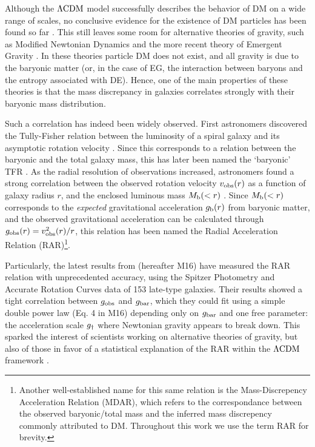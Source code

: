 \documentclass[fleqn,usenatbib]{mnras}
\newcommand{\lcdm}{{\rm \Lambda CDM}}
\newcommand{\un}[1]{_{\rm #1}}
\begin{document}
Although the $\lcdm$ model successfully describes the behavior of DM on a wide range of scales, no conclusive evidence for the existence of DM particles has been found so far \cite[despite years of enormous effort; for an overview, see][]{bertone2005,bertone2018}. This still leaves some room for alternative theories of gravity, such as Modified Newtonian Dynamics  \cite[MOND,][]{milgrom1983} and the more recent theory of Emergent Gravity \cite[EG,][]{verlinde2016}. In these theories particle DM does not exist, and all gravity is due to the baryonic matter (or, in the case of EG, the interaction between baryons and the entropy associated with DE). Hence, one of the main properties of these theories is that the mass discrepancy in galaxies correlates strongly with their baryonic mass distribution.

Such a correlation has indeed been widely observed. First astronomers discovered the Tully-Fisher relation \cite[TFR,][]{tully1977} between the luminosity of a spiral galaxy and its asymptotic rotation velocity \cite[]{pierce1988,bernstein1994}. Since this corresponds to a relation between the baryonic and the total galaxy mass, this has later been named the `baryonic' TFR \cite[BTFR,][]{mcgaugh2000,mcgaugh2012}. As the radial resolution of observations increased, astronomers found a strong correlation between the observed rotation velocity $v\un{obs}(r)$ as a function of galaxy radius $r$, and the enclosed luminous mass \mbox{$M\un{b}(<r)$} \cite[]{sanders1986,sanders1996,mcgaugh2004,sanders2007,wu2015}. Since $M\un{b}(<r)$ corresponds to the \emph{expected} gravitational acceleration $g\un{b}(r)$ from baryonic matter, and the observed gravitational acceleration can be calculated through $g\un{obs}(r)=v\un{obs}^2(r)/r$, this relation has been named the Radial Acceleration Relation (RAR)\footnote{Another well-established name for this same relation is the Mass-Discrepency Acceleration Relation (MDAR), which refers to the correspondance between the observed baryonic/total mass and the inferred mass discrepency commonly attributed to DM. Throughout this work we use the term RAR for brevity.}.

Particularly, the latest results from \cite{mcgaugh2016} (hereafter M16) have measured the RAR relation with unprecedented accuracy, using the Spitzer Photometry and Accurate Rotation Curves \cite[SPARC,][]{lelli2016b} data of 153 late-type galaxies. Their results showed a tight correlation between $g\un{obs}$ and $g\un{bar}$, which they could fit using a simple double power law (Eq. 4 in M16) depending only on $g\un{bar}$ and one free parameter: the acceleration scale $g\un{\dagger}$ where Newtonian gravity appears to break down. This sparked the interest of scientists working on alternative theories of gravity, but also of those in favor of a statistical explanation of the RAR within the $\lcdm$ framework \cite[]{keller2017,desmond2017,ludlow2017}.
\end{document}
